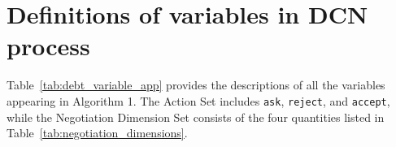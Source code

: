 \section{Definitions of variables in DCN process}

Table~\ref{tab:debt_variable_app} provides the descriptions of all the variables appearing in Algorithm 1. The Action Set includes \texttt{ask}, \texttt{reject}, and \texttt{accept}, while the Negotiation Dimension Set consists of the four quantities listed in Table~\ref{tab:negotiation_dimensions}.


\begin{table}[ht]
\centering
\Large
\caption{Definitions of variables in DCN process.}

\label{tab:debt_variable_app}
\end{table}
